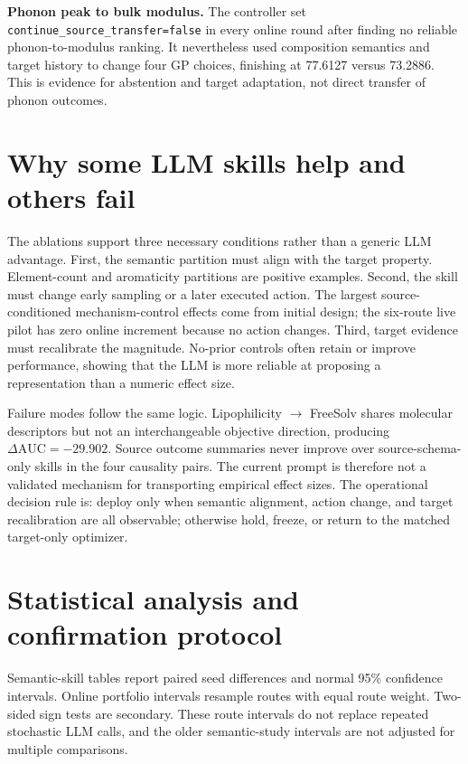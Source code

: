 \documentclass[pdflatex,sn-nature]{sn-jnl}
\newcommand{\dauc}{\Delta\mathrm{AUC}}
\newcommand{\code}[1]{\texttt{#1}}
\begin{document}
\begin{appendices}
\noindent\textbf{Phonon peak to bulk modulus.}
The controller set \code{continue\_source\_transfer=false} in every online
round after finding no reliable phonon-to-modulus ranking. It nevertheless
used composition semantics and target history to change four GP choices,
finishing at 77.6127 versus 73.2886. This is evidence for abstention and target
adaptation, not direct transfer of phonon outcomes.

\section{Why some LLM skills help and others fail}
\label{sec:why}

The ablations support three necessary conditions rather than a generic LLM
advantage. First, the semantic partition must align with the target property.
Element-count and aromaticity partitions are positive examples. Second, the
skill must change early sampling or a later executed action. The largest
source-conditioned mechanism-control effects come from initial design; the
six-route live pilot has zero online increment because no action changes.
Third, target evidence must recalibrate the magnitude. No-prior controls often
retain or improve performance, showing that the LLM is more reliable at
proposing a representation than a numeric effect size.

Failure modes follow the same logic. Lipophilicity $\rightarrow$ FreeSolv
shares molecular descriptors but not an interchangeable objective direction,
producing $\dauc=-29.902$. Source outcome summaries never improve over
source-schema-only skills in the four causality pairs. The current prompt is
therefore not a validated mechanism for transporting empirical effect sizes.
The operational decision rule is: deploy only when semantic alignment,
action change, and target recalibration are all observable; otherwise hold,
freeze, or return to the matched target-only optimizer.

\section{Statistical analysis and confirmation protocol}
\label{sec:statistics}

Semantic-skill tables report paired seed differences and normal 95\%
confidence intervals. Online portfolio intervals resample routes with equal
route weight. Two-sided sign tests are secondary. These route intervals do not
replace repeated stochastic LLM calls, and the older semantic-study intervals
are not adjusted for multiple comparisons.


\end{appendices}
\end{document}
